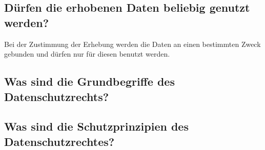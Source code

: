 	\subsection{Dürfen die erhobenen Daten beliebig genutzt werden?}
	Bei der Zustimmung der Erhebung werden die Daten an einen bestimmten Zweck gebunden und dürfen nur für diesen benutzt werden.
	\subsection{Was sind die Grundbegriffe des Datenschutzrechts?}
	
	\subsection{Was sind die Schutzprinzipien des Datenschutzrechtes?}
	
	
	
						
